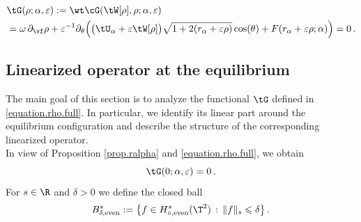 \documentclass[a4paper,reqno,10pt]{article}
\newcommand{\pa}{\partial}
\begin{document}
\begin{equation}\label{equation.rho.full}
			\begin{aligned}
			&\tG(\rho;\alpha,\varepsilon)  := \wt\cG(\tW[\rho],\rho;\alpha,\varepsilon)  \\
			&	= \omega\,\pa_{\vf} \rho + \varepsilon^{-1} \pa_{\theta} \Big( \big(\tU_{\alpha}+\varepsilon\tW[\rho]\big) \sqrt{1+2(r_\alpha+\varepsilon\rho)} \cos(\theta) + F(r_\alpha+\varepsilon\rho;\alpha) \Big) = 0 \,.
		\end{aligned}
\end{equation}
\subsection{Linearized operator at the equilibrium}
The main goal of this section is to analyze the functional \(\tG\) defined in \eqref{equation.rho.full}. In particular, we identify its linear part around the equilibrium configuration and describe the structure of the corresponding linearized operator.\\ 
In view  of Proposition \ref{prop.ralpha} and \eqref{equation.rho.full}, we obtain
  $$\tG(0;\alpha,\varepsilon)=0 \,.
$$
For $s\in\R$ and $\delta>0$ we define the closed ball
\begin{equation*}
	B_{\delta,\textnormal{even}}^{s} := \big\{ f \in H^s_{\circ,\textnormal{even}}(\T^2) \, : \, \| f\|_{s} \leqslant \delta \big\}\,.
\end{equation*}
\end{document}
